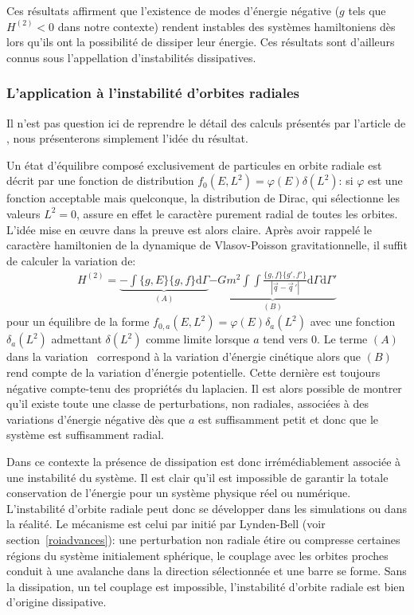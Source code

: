 Ces résultats affirment que l'existence de modes d'énergie négative ($g$ tels que $H^{(2)}<0$ dans notre contexte) rendent instables des systèmes
hamiltoniens dès lors qu'ils ont la possibilité de dissiper leur énergie. Ces résultats sont d'ailleurs connus sous l'appellation \og d'instabilités
dissipatives\fg.



\subsubsection{L'application à l'instabilité d'orbites radiales}

Il n'est pas question ici de reprendre le détail des calculs présentés par l'article de \cite{future}, nous présenterons
simplement l'idée du résultat.

Un état d'équilibre composé exclusivement de particules en orbite radiale est décrit par une fonction de distribution $f_0(E,L^2) = \varphi(E)
\delta(L^2)$: si $\varphi$ est une fonction acceptable mais quelconque, la distribution de Dirac, qui sélectionne les valeurs $L^2=0$,  assure en
effet le caractère purement radial de toutes les orbites. L'idée mise en œuvre dans la preuve est alors claire. Après avoir rappelé le caractère
hamiltonien de la dynamique de Vlasov-Poisson gravitationnelle, il suffit de calculer la variation de:
\begin{align}
	H^{(2)} =
	\underbrace{- \int \{g,E\} \{g,f\} \mathrm{d} \Gamma}_{(A)}
	\underbrace{- G m^2 %
		\int\!\!\!\int \frac{\{g,f\}\{g',f'\}}{|\vec{q} - \vec{q}\,'|}
		\mathrm{d} \Gamma \mathrm{d} \Gamma'}_{(B)}
		\label{H2AB}
\end{align}
pour un équilibre de la forme $f_{0,a}(E,L^2) = \varphi(E) \delta_a (L^2)$ avec une fonction $\delta_a (L^2)$ admettant $\delta(L^2)$ comme limite lorsque $a$ tend
vers $0$. Le terme $(A)$ dans la variation~ correspond à la variation d'énergie cinétique alors que $(B)$ rend compte de la variation
d'énergie potentielle. Cette dernière est toujours négative compte-tenu des propriétés du laplacien. Il est alors possible de montrer qu'il %
existe toute une classe de perturbations, non radiales, associées à des variations d'énergie négative dès que $a$ est suffisamment petit et donc que
le système est suffisamment radial.

Dans ce contexte la présence de dissipation est donc irrémédiablement associée à une instabilité du système. Il est clair qu'il est impossible de
garantir la totale conservation de l'énergie pour un système physique réel ou numérique. L'instabilité d'orbite radiale peut donc se développer dans
les simulations ou dans la réalité. Le mécanisme est celui par initié par Lynden-Bell (voir section~\ref{roiadvances}): une perturbation non
radiale étire ou compresse certaines régions du système initialement sphérique, le couplage avec les orbites proches conduit à une avalanche dans la
direction sélectionnée et une barre se forme. Sans la dissipation, un tel couplage est impossible, l'instabilité d'orbite radiale est bien d'origine
dissipative.

